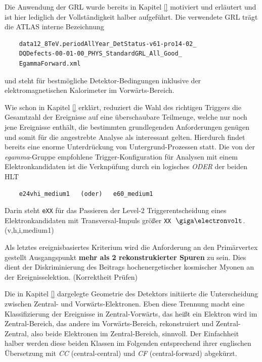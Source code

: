 \begin{description}
        Die Anwendung der \ac{GRL} wurde bereits in Kapitel \ref{} motiviert
        und erläutert und ist hier lediglich der Vollständigkeit halber
        aufgeführt. Die verwendete \ac{GRL} trägt die ATLAS interne Bezeichnung
        \begin{verbatim}
    data12_8TeV.periodAllYear_DetStatus-v61-pro14-02_
    DQDefects-00-01-00_PHYS_StandardGRL_All_Good_
    EgammaForward.xml \end{verbatim}
        und steht für bestmögliche Detektor-Bedingungen inklusive der
        elektromagnetischen Kalorimeter im Vorwärts-Bereich.

        Wie schon in Kapitel \ref{} erklärt, reduziert die Wahl des richtigen
        Triggers die Gesamtzahl der Ereignisse auf eine überschaubare
        Teilmenge, welche nur noch jene Ereignisse enthält, die bestimmten
        grundlegenden Anforderungen genügen und somit für die angestrebte
        Analyse als interessant gelten. Hierdurch findet bereits eine enorme
        Unterdrückung von Untergrund-Prozessen statt. Die von der
        \textit{egamma}-Gruppe empfohlene Trigger-Konfiguration für Analysen
        mit einem Elektronkandidaten ist die Verknpüfung durch ein logisches
        \emph{ODER} der beiden \acl{HLT}
        \begin{verbatim}
    e24vhi_medium1   (oder)   e60_medium1 \end{verbatim}
        Darin steht \texttt{eXX} für das Passieren der Level-2
        Triggerentscheidung eines Elektronkandidaten mit Transversal-Impuls
        größer \texttt{XX} $\GeV$.
        \newline\development (v,h,i,medium1)

        Als letztes ereignisbasiertes Kriterium wird die Anforderung an den
        Primärvertex gestellt Ausgangspunkt \textbf{mehr als 2 rekonstrukierter
        Spuren} zu sein. Dies dient der Diskriminierung des Beitrags
        hochenergetischer kosmischer Myonen an der Ereignisselektion.
        \newline\development (Korrektheit Prüfen)

        Die in Kapitel \ref{} dargelegte
        Geometrie des Detektors initiierte die Unterscheidung zwischen
        Zentral- und Vorwärts-Elektronen. Eben diese Trennung macht eine
        Klassifizierung der Ereignisse in Zentral-Vorwärts, das heißt ein
        Elektron wird im Zentral-Bereich, das andere im Vorwärts-Bereich,
        rekonstruiert und Zentral-Zentral, also beide Elektronen im
        Zentral-Bereich, sinnvoll. Der Einfachheit halber werden diese beiden
        Klassen im Folgenden entsprechend ihrer englischen Übersetzung mit
        \emph{CC} (central-central) und \emph{CF} (central-forward) abgekürzt. 


\end{description}
